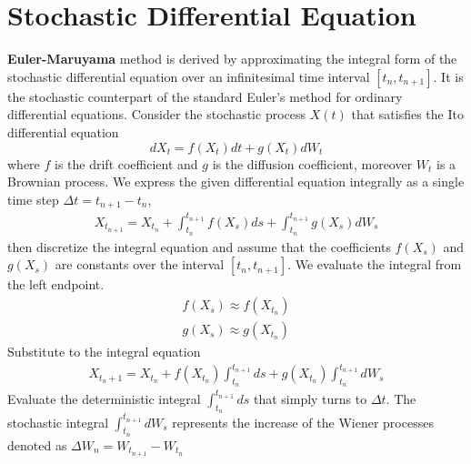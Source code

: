 \section*{Stochastic Differential Equation}
\textbf{Euler-Maruyama} \cite{wiki:euler-maruyama} method is derived by approximating the integral form of the stochastic differential equation over an infinitesimal time interval  $[t_n, t_{n+1}]$. It is the stochastic counterpart of the standard Euler's method for ordinary differential equations. Consider the stochastic process $X(t)$ that satisfies the Ito differential equation
\begin{equation}\tag{1}\label{eq:sde_1}
dX_t = f(X_t)dt + g(X_t)dW_t
\end{equation}
where $f$ is the drift coefficient and $g$ is the diffusion coefficient, moreover $W_t$ is a Brownian process.
We express the given differential equation integrally as a single time step $\Delta t= t_{n+1} - t_n$,
\begin{align*}
X_{t_{n+1}} = X_{t_n} + \int_{t_n}^{t_{n+1}} f(X_s)ds + \int_{t_n}^{t_{n+1}} g(X_s)dW_s
\end{align*}
then discretize the integral equation and assume that the coefficients $f(X_s)$ and $g(X_s)$ are constants over the interval $[t_n, t_{n+1}]$. We evaluate the integral from the left endpoint.
\begin{align*}
f(X_s) \approx f(X_{t_n})\\
g(X_s) \approx g(X_{t_n})
\end{align*}
Substitute to the integral equation
\begin{align*}
X_{t_n+1} =  X_{t_n} + f(X_{t_n}) \int_{t_n}^{t_{n+1}} ds + g(X_{t_n}) \int_{t_n}^{t_{n+1}} dW_s
\end{align*}
Evaluate the deterministic integral $\int_{t_n}^{t_{n+1}} ds$ that simply turns to $\Delta t$. The stochastic integral $\int_{t_n}^{t_{n+1}} dW_s$ represents the increase of the Wiener processes denoted as $\Delta W_n = W_{t_{n+1}} - W_{t_n}$


